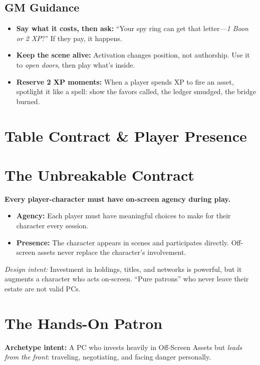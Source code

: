 \documentclass[12pt]{article}
\begin{document}
\subsection*{GM Guidance}
\begin{itemize}
  \item \textbf{Say what it costs, then ask:} ``Your spy ring can get that letter—\emph{1 Boon or 2 XP}?'' If they pay, it happens.
  \item \textbf{Keep the scene alive:} Activation changes position, not authorship. Use it to \emph{open doors}, then play what’s inside.
  \item \textbf{Reserve 2 XP moments:} When a player spends XP to fire an asset, spotlight it like a spell: show the favors called, the ledger smudged, the bridge burned.
\end{itemize}

\section{Table Contract \& Player Presence}

\section{The Unbreakable Contract}
\textbf{Every player-character must have on-screen agency during play.}
\begin{itemize}
  \item \textbf{Agency:} Each player must have meaningful choices to make for their character every session.
  \item \textbf{Presence:} The character appears in scenes and participates directly. Off-screen assets never replace the character’s involvement.
\end{itemize}
\noindent
\textit{Design intent:} Investment in holdings, titles, and networks is powerful, but it augments a character who acts on-screen. “Pure patrons” who never leave their estate are not valid PCs.

\section{The Hands-On Patron}
\textbf{Archetype intent:} A PC who invests heavily in Off-Screen Assets but \emph{leads from the front}: traveling, negotiating, and facing danger personally.
\end{document}
